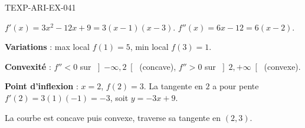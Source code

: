 \begin{corrige}{TEXP-ARI-EX-041}

$f'(x) = 3x^2 - 12x + 9 = 3(x-1)(x-3)$. $f''(x) = 6x - 12 = 6(x-2)$.


\textbf{Variations} : max local $f(1)=5$, min local $f(3)=1$.

\textbf{Convexité} : $f''<0$ sur $\left]-\infty,2\right[$ (concave), $f''>0$ sur $\left]2,+\infty\right[$ (convexe).

\textbf{Point d'inflexion} : $x=2$, $f(2)=3$. La tangente en $2$ a pour pente $f'(2) = 3(1)(-1) = -3$, soit $y = -3x+9$.

La courbe est concave puis convexe, traverse sa tangente en $(2,3)$.

\end{corrige}
